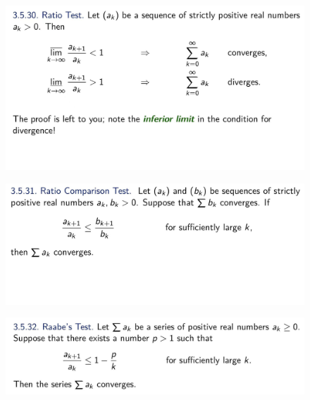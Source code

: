 \documentclass{beamer}
\begin{document}
\begin{frame}
    \begin{figure}[htbp]
        \centering
        \includegraphics[width=12cm]{ratio_limit.jpg}
    \end{figure}
\end{frame}
\begin{frame}
    \begin{figure}[htbp]
        \centering
        \includegraphics[width=12cm]{ratiocompare.jpg}
    \end{figure}
\end{frame}
\begin{frame}
    \begin{figure}[htbp]
        \centering
        \includegraphics[width=12cm]{raabe.jpg}
    \end{figure}
\end{frame}
\end{document}
